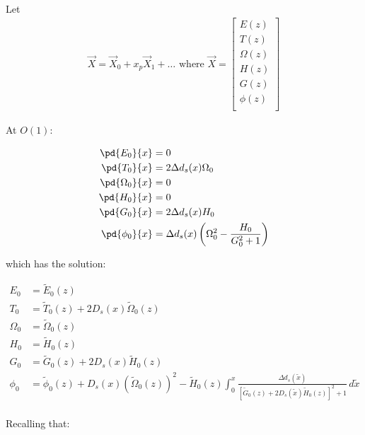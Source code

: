 \\
Let 
\begin{equation}
\begin{split}
\vec{X} = \vec{X}_0 + x_p \vec{X}_1 + \dots \mbox{ where } \vec{X} = \left[\begin{array}{c}
E(z) \\ 
T(z) \\
\Omega(z)\\
H(z) \\
G(z) \\ 
\phi(z)\\
\end{array}\right]
\end{split}
\end{equation}

At $O(1)$:

\begin{equation}
\begin{split}
\pd{E_0}{x} &= 0\\
\pd{T_0}{x} &= 2\Delta d_s(x) \Omega_0 \\
\pd{\Omega_0}{x} &=  0\\
\pd{H_0}{x} &= 0\\
\pd{G_0}{x} &= 2\Delta d_s(x) H_0\\ 
\pd{\phi_0}{x} &= \Delta d_s(x) \left(\Omega_0^2 - \frac{H_0}{G_0^2+1}\right) \\
\end{split}
\end{equation}

which has the solution:

\begin{equation}
\begin{split}
E_0 &= \tilde{E}_0(z) \\
T_0 &= \tilde{T}_0(z) + 2 D_s(x) \tilde{\Omega}_0(z) \\
\Omega_0 &= \tilde{\Omega}_0(z)\\ 
H_0 &= \tilde{H}_0(z)\\
G_0 &= \tilde{G}_0(z) + 2 D_s(x) \tilde{H}_0(z)\\ 
\phi_0 & =\tilde{\phi}_0(z) +  D_s(x)\left(\tilde{\Omega}_0(z)\right)^2 - \tilde{H}_0(z) \int_{0}^{x}\frac{\Delta d_s(\tilde{x})}{\left[\tilde{G}_0(z) + 2 D_s(\tilde{x}) \tilde{H}_0(z)\right]^2 +1} \,d\tilde{x} \\
\end{split}
\end{equation}

Recalling that:

